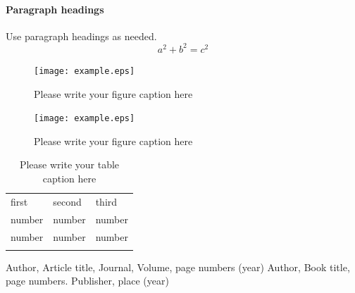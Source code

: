 \documentclass[smallextended]{svjour3}       %
\begin{document}
\paragraph{Paragraph headings} Use paragraph headings as needed.
\begin{equation}
a^2+b^2=c^2
\end{equation}

\begin{figure}
  \texttt{[image: example.eps]}
\caption{Please write your figure caption here}
\label{fig:1}       %
\end{figure}
%
\begin{figure}
  \texttt{[image: example.eps]}
\caption{Please write your figure caption here}
\label{fig:2}       %
\end{figure}
%
\begin{table}
\caption{Please write your table caption here}
\label{tab:1}       %
\begin{tabular}{lll}
\hline\noalign{\smallskip}
first & second & third  \\
\noalign{\smallskip}\hline\noalign{\smallskip}
number & number & number \\
number & number & number \\
\noalign{\smallskip}\hline
\end{tabular}
\end{table}




\begin{thebibliography}{}
%
%
Author, Article title, Journal, Volume, page numbers (year)
Author, Book title, page numbers. Publisher, place (year)
\end{thebibliography}
\end{document}
